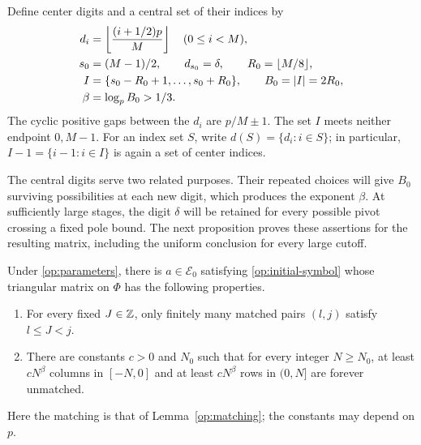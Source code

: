Define center digits and a central set of their indices by
\begin{align}
 d_i&=\left\lfloor\frac{(i+1/2)p}{M}\right\rfloor
           \quad(0\le i<M),\notag\\
 s_0&=(M-1)/2,\qquad d_{s_0}=\delta,\qquad
 R_0=\lfloor M/8\rfloor,\notag\\
 I&=\{s_0-R_0+1,\ldots,s_0+R_0\},\qquad
 B_0=|I|=2R_0,\notag\\
 \beta&=\log_p B_0>1/3.
 \label{op:centers}
\end{align}
The cyclic positive gaps between the $d_i$ are $p/M\pm1$.
The set $I$ meets neither endpoint $0,M-1$. For an index set $S$, write
$d(S)=\{d_i:i\in S\}$; in particular,
$I-1=\{i-1:i\in I\}$ is again a set of center indices.

The central digits serve two related purposes. Their repeated
choices will give $B_0$ surviving possibilities at each new digit,
which produces the exponent $\beta$. At sufficiently large stages,
the digit $\delta$ will be retained for every possible pivot
crossing a fixed pole bound.
The next proposition proves these assertions for the resulting
matrix, including the uniform conclusion for every large cutoff.

\begin{proposition}
\label{op:operator}
Under \eqref{op:parameters}, there is $a\in\mathscr E_0$ satisfying
\eqref{op:initial-symbol} whose triangular matrix on $\Phi$ has the
following properties.
\begin{enumerate}
\item For every fixed $J\in\mathbb Z$, only finitely many matched pairs
$(l,j)$ satisfy $l\le J<j$.
\item There are constants $c>0$ and $N_0$ such that for every integer
$N\ge N_0$, at least $cN^\beta$ columns in $[-N,0]$ and at least
$cN^\beta$ rows in $(0,N]$ are forever unmatched.
\end{enumerate}
Here the matching is that of Lemma~\ref{op:matching}; the constants
may depend on $p$.
\end{proposition}


